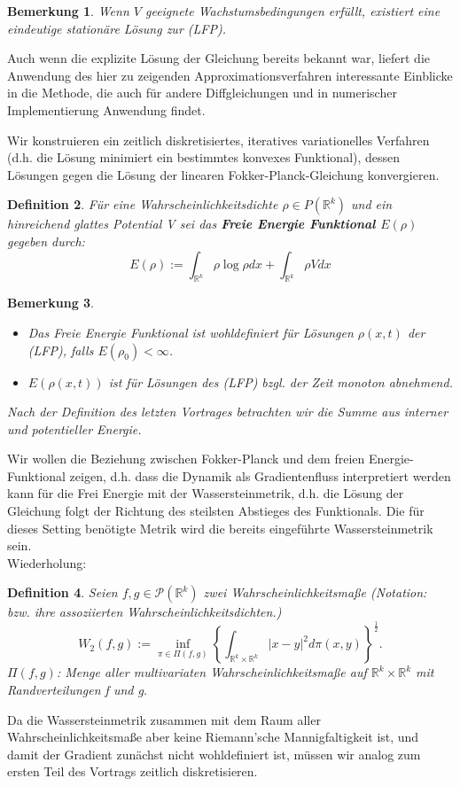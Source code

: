 \documentclass[11pt,a4paper,notitlepage]{scrreprt}
\newcommand{\RR}{\mathbb{R}}
\newtheorem{defi}{Definition}[section]
\newtheorem{bem}[defi]{Bemerkung}
\begin{document}
\begin{bem}
Wenn $V$ geeignete Wachstumsbedingungen erfüllt, existiert eine eindeutige stationäre Lösung zur (LFP).
\end{bem}
Auch wenn die explizite Lösung der Gleichung bereits bekannt war, liefert die Anwendung des hier zu zeigenden Approximationsverfahren interessante Einblicke in die Methode, die auch für andere Diffgleichungen und in numerischer Implementierung Anwendung findet. 


Wir konstruieren ein zeitlich diskretisiertes, iteratives variationelles Verfahren (d.h. die Lösung minimiert ein bestimmtes konvexes Funktional), dessen Lösungen gegen die Lösung der linearen Fokker-Planck-Gleichung konvergieren.

\begin{defi}
Für eine Wahrscheinlichkeitsdichte $\rho\in P(\RR^k)$ und ein hinreichend glattes Potential V sei das \textbf{Freie Energie Funktional $E(\rho)$} gegeben durch:
\begin{equation}
E(\rho):=\int_{\RR^k} \rho\log\rho dx + \int_{\RR^k}\rho V dx \label{FEFktn}
\end{equation}
\end{defi}

\begin{bem}
\begin{itemize}
\item Das Freie Energie Funktional ist wohldefiniert für Lösungen $\rho(x,t)$ der (LFP), falls $E(\rho_0)<\infty$.
\item $E(\rho(x,t))$ ist für Lösungen des (LFP) bzgl. der Zeit monoton abnehmend.\end{itemize}
\item Nach der Definition des letzten Vortrages betrachten wir die Summe aus interner und potentieller Energie.
\end{bem}

Wir wollen die Beziehung zwischen Fokker-Planck und dem freien Energie-Funktional zeigen, d.h. dass die Dynamik als Gradientenfluss interpretiert werden kann für die Frei Energie mit der Wassersteinmetrik, d.h. die Lösung der Gleichung folgt der Richtung des steilsten Abstieges des Funktionals. Die für dieses Setting benötigte Metrik wird die bereits eingeführte Wassersteinmetrik sein. \\

Wiederholung:
\begin{defi}
Seien $f,g\in\mathcal{P}(\RR^k)$ zwei Wahrscheinlichkeitsmaße (Notation: bzw. ihre assoziierten Wahrscheinlichkeitsdichten.)
\begin{equation}
W_2(f,g):=\inf_{\pi \in \Pi(f,g)} \left\{ \int_{\RR^k\times\RR^k} \vert x-y \vert^2 d\pi(x,y)\right\}^\frac{1}{2}.\label{W2}
\end{equation}
$\Pi(f,g)$: Menge aller multivariaten Wahrscheinlichkeitsmaße auf $\RR^k \times \RR^k$ mit Randverteilungen f und g.
\end{defi}
Da die Wassersteinmetrik zusammen mit dem Raum aller Wahrscheinlichkeitsmaße aber keine Riemann'sche Mannigfaltigkeit ist, und damit der Gradient zunächst nicht wohldefiniert ist, müssen wir analog zum ersten Teil des Vortrags zeitlich diskretisieren.\\
\end{document}
